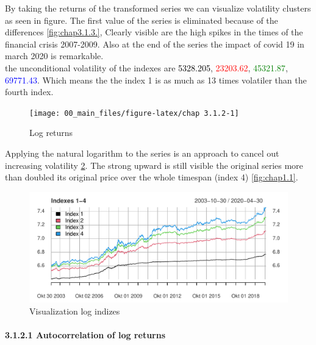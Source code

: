 \documentclass[
]{article}
\begin{document}
\newpage

By taking the returns of the transformed series we can visualize
volatility clusters as seen in figure. The first value of the series is
eliminated because of the differences \ref{fig:chap3.1.3.}, Clearly
visible are the high spikes in the times of the financial crisis
2007-2009. Also at the end of the series the impact of covid 19 in march
2020 is remarkable.\\
the unconditional volatility of the indexes are
\textcolor{black}{5328.205}, \textcolor{red}{23203.62},
\textcolor{green}{45321.87}, \textcolor{blue}{69771.43}. Which means the
the index 1 is as much as 13 times volatiler than the fourth index.

\begin{figure}

{\centering \texttt{[image: 00\_main\_files/figure-latex/chap 3.1.2-1]} 

}

\caption{Log returns}\label{fig:chap 3.1.2}
\end{figure}

Applying the natural logarithm to the series is an approach to cancel
out increasing volatility \ref{fig:chap3.1.2}. The strong upward is
still visible the original series more than doubled its original price
over the whole timespan (index 4) \ref{fig:chap1.1}.

\begin{figure}

{\centering \includegraphics[width=0.7\linewidth]{00_main_files/figure-latex/chap3.1.2-1} 

}

\caption{Visualization log indizes}\label{fig:chap3.1.2}
\end{figure}

\newpage

\hypertarget{autocorrelation-of-log-returns}{%
\paragraph{3.1.2.1 Autocorrelation of log
returns}\label{autocorrelation-of-log-returns}}
\end{document}
